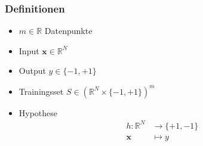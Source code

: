 \begin{frame}
    \frametitle{Definitionen}

    \begin{itemize}
        \item $ m \in \mathbb{R} $ Datenpunkte
        \item Input $ \boldsymbol{x} \in \mathbb{R}^N $
        \item Output $ y \in \{ -1, +1 \} $
        \item Trainingsset $S \in (\mathbb{R}^N \times \{ -1, +1 \})^m $
    \end{itemize}

    \vspace{2mm}

    \begin{itemize}
        \item Hypothese
            \begin{align*}
                h: \mathbb{R}^N &\to \{ +1, -1 \} \\
                \boldsymbol{x} &\mapsto y \\
            \end{align*}
    \end{itemize}

    \vspace{3mm}


\end{frame}
